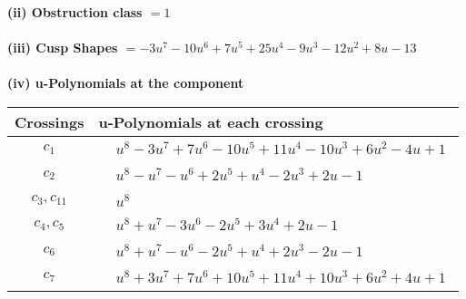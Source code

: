 \documentclass[1p]{elsarticle_modified}
\theoremstyle{definition}
\begin{document}
\flushleft \textbf{(ii) Obstruction class $= 1$}\\~\\
\flushleft \textbf{(iii) Cusp Shapes $= -3 u^7-10 u^6+7 u^5+25 u^4-9 u^3-12 u^2+8 u-13$}\\~\\
\newpage\renewcommand{\arraystretch}{1}
\flushleft \textbf{(iv) u-Polynomials at the component}\newline \\
\begin{tabular}{m{50pt}|m{274pt}}
Crossings & \hspace{64pt}u-Polynomials at each crossing \\
\hline $$\begin{aligned}c_{1}\end{aligned}$$&$\begin{aligned}
&u^8-3 u^7+7 u^6-10 u^5+11 u^4-10 u^3+6 u^2-4 u+1
\end{aligned}$\\
\hline $$\begin{aligned}c_{2}\end{aligned}$$&$\begin{aligned}
&u^8- u^7- u^6+2 u^5+u^4-2 u^3+2 u-1
\end{aligned}$\\
\hline $$\begin{aligned}c_{3},c_{11}\end{aligned}$$&$\begin{aligned}
&u^8
\end{aligned}$\\
\hline $$\begin{aligned}c_{4},c_{5}\end{aligned}$$&$\begin{aligned}
&u^8+u^7-3 u^6-2 u^5+3 u^4+2 u-1
\end{aligned}$\\
\hline $$\begin{aligned}c_{6}\end{aligned}$$&$\begin{aligned}
&u^8+u^7- u^6-2 u^5+u^4+2 u^3-2 u-1
\end{aligned}$\\
\hline $$\begin{aligned}c_{7}\end{aligned}$$&$\begin{aligned}
&u^8+3 u^7+7 u^6+10 u^5+11 u^4+10 u^3+6 u^2+4 u+1
\end{aligned}$\\

\end{tabular}
\end{document}
